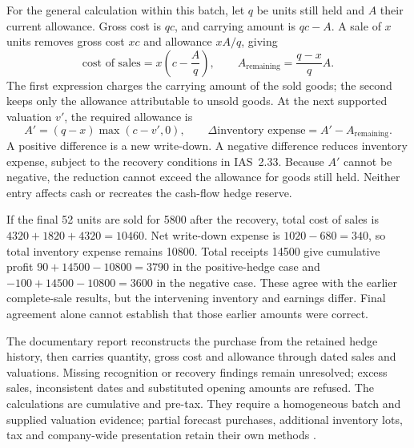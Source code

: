 For the general calculation within this batch, let $q $ be units still held and
$A$ their current allowance. Gross cost is $qc $, and carrying amount is $qc-A$.
A sale of $x $ units removes gross cost $xc $ and allowance $xA/q $, giving
\[
 \text{cost of sales}=x\left(c-\frac{A}{q}\right),
 \qquad A_{\mathrm{remaining}}=\frac{q-x}{q}A.
\]
The first expression charges the carrying amount of the sold goods; the
second keeps only the allowance attributable to unsold goods. At the next
supported valuation $v'$, the required allowance is
\[
 A'=(q-x)\max(c-v',0),\qquad
 \Delta\text{inventory expense}=A'-A_{\mathrm{remaining}}.
\]
A positive difference is a new write-down. A negative difference reduces
inventory expense, subject to the recovery conditions in IAS~2.33. Because
$A'$ cannot be negative, the reduction cannot exceed the allowance for goods
still held. Neither entry affects cash or recreates the cash-flow hedge reserve.

If the final 52 units are sold for 5800 after the recovery, total cost of sales
is $4320+1820+4320=10460$. Net write-down expense is $1020-680=340$, so total
inventory expense remains 10800. Total receipts 14500 give cumulative profit
$90+14500-10800=3790$ in the positive-hedge case and
$-100+14500-10800=3600$ in the negative case. These agree with the earlier
complete-sale results, but the intervening inventory and earnings differ.
Final agreement alone cannot establish that those earlier amounts were correct.

The documentary  report reconstructs the
purchase from the retained hedge history, then carries quantity, gross cost
and allowance through dated sales and valuations. Missing recognition or
recovery findings remain unresolved; excess sales, inconsistent dates and
substituted opening amounts are refused. The calculations are cumulative and
pre-tax. They require a homogeneous batch and supplied valuation evidence;
partial forecast purchases, additional inventory lots, tax and company-wide
presentation retain their own methods \citep[IAS~2, paragraphs 25, 27--34]{eu20231803}.
